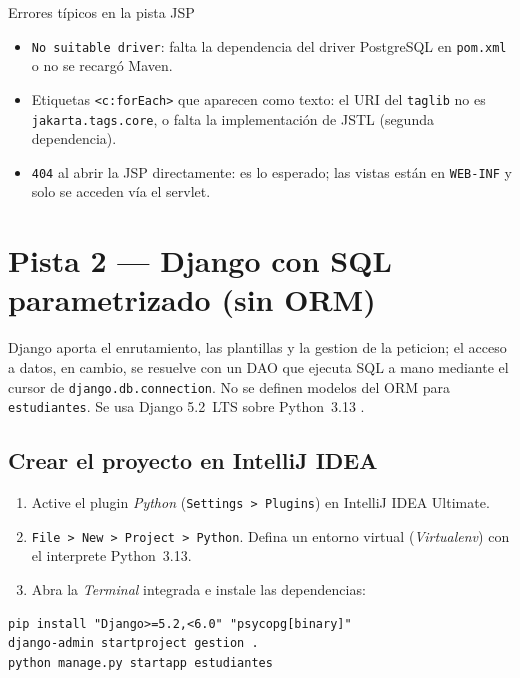 \begin{cajaadvertencia}{Errores típicos en la pista JSP}
\begin{itemize}
\item \texttt{No suitable driver}: falta la dependencia del driver
PostgreSQL en \texttt{pom.xml} o no se recargó Maven.
\item Etiquetas \texttt{<c:forEach>} que aparecen como texto: el URI del
\texttt{taglib} no es \texttt{jakarta.tags.core}, o falta la
implementación de JSTL (segunda dependencia).
\item \texttt{404} al abrir la JSP directamente: es lo esperado; las
vistas están en \texttt{WEB-INF} y solo se acceden vía el servlet.
\end{itemize}
\end{cajaadvertencia}

\section{Pista 2 --- Django con SQL parametrizado (sin ORM)}
\label{ap:crud:django}

Django aporta el enrutamiento, las plantillas y la gestion de la
peticion; el acceso a datos, en cambio, se resuelve con un DAO que
ejecuta SQL a mano mediante el cursor de \texttt{django.db.connection}.
No se definen modelos del ORM para \texttt{estudiantes}. Se usa Django
5.2~LTS sobre Python~3.13 \cite{django52docs}.

\subsection{Crear el proyecto en IntelliJ IDEA}
\label{ap:crud:django:crear}

\begin{enumerate}
\item Active el plugin \emph{Python} (\texttt{Settings > Plugins}) en
IntelliJ IDEA Ultimate.
\item \texttt{File > New > Project > Python}. Defina un entorno virtual
(\emph{Virtualenv}) con el interprete Python~3.13.
\item Abra la \emph{Terminal} integrada e instale las dependencias:
\end{enumerate}

\begin{lstlisting}[style=shell,caption={Instalacion de Django y el adaptador de PostgreSQL},label={lst:dj-pip}]
pip install "Django>=5.2,<6.0" "psycopg[binary]"
django-admin startproject gestion .
python manage.py startapp estudiantes
\end{lstlisting}

